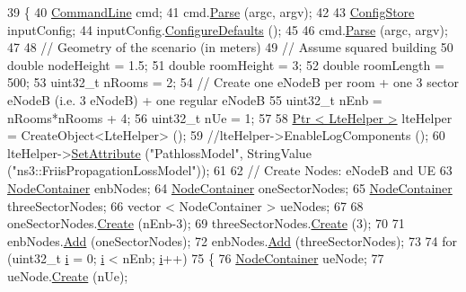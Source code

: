 \begin{DoxyCode}
39 \{
40   \hyperlink{classns3_1_1CommandLine}{CommandLine} cmd;
41   cmd.\hyperlink{classns3_1_1CommandLine_a5c10b85b3207e5ecb48d907966923156}{Parse} (argc, argv);
42 
43   \hyperlink{classns3_1_1ConfigStore}{ConfigStore} inputConfig;
44   inputConfig.\hyperlink{classns3_1_1ConfigStore_a0a6137574d7c847c3823af8b9d1bb886}{ConfigureDefaults} ();
45 
46   cmd.\hyperlink{classns3_1_1CommandLine_a5c10b85b3207e5ecb48d907966923156}{Parse} (argc, argv);
47 
48   \textcolor{comment}{// Geometry of the scenario (in meters)}
49   \textcolor{comment}{// Assume squared building}
50   \textcolor{keywordtype}{double} nodeHeight = 1.5;
51   \textcolor{keywordtype}{double} roomHeight = 3;
52   \textcolor{keywordtype}{double} roomLength = 500;
53   uint32\_t nRooms = 2;
54   \textcolor{comment}{// Create one eNodeB per room + one 3 sector eNodeB (i.e. 3 eNodeB) + one regular eNodeB}
55   uint32\_t nEnb = nRooms*nRooms + 4;
56   uint32\_t nUe = 1;
57 
58   \hyperlink{classns3_1_1Ptr}{Ptr < LteHelper >} lteHelper = CreateObject<LteHelper> ();
59   \textcolor{comment}{//lteHelper->EnableLogComponents ();}
60   lteHelper->\hyperlink{classns3_1_1ObjectBase_ac60245d3ea4123bbc9b1d391f1f6592f}{SetAttribute} (\textcolor{stringliteral}{"PathlossModel"}, StringValue (\textcolor{stringliteral}{"ns3::FriisPropagationLossModel"}));
61 
62   \textcolor{comment}{// Create Nodes: eNodeB and UE}
63   \hyperlink{classns3_1_1NodeContainer}{NodeContainer} enbNodes;
64   \hyperlink{classns3_1_1NodeContainer}{NodeContainer} oneSectorNodes;
65   \hyperlink{classns3_1_1NodeContainer}{NodeContainer} threeSectorNodes;
66   vector < NodeContainer > ueNodes;
67 
68   oneSectorNodes.\hyperlink{classns3_1_1NodeContainer_a787f059e2813e8b951cc6914d11dfe69}{Create} (nEnb-3);
69   threeSectorNodes.\hyperlink{classns3_1_1NodeContainer_a787f059e2813e8b951cc6914d11dfe69}{Create} (3);
70 
71   enbNodes.\hyperlink{classns3_1_1NodeContainer_aa60b3a0e70f2fb324e16ffcf8bf31fcb}{Add} (oneSectorNodes);
72   enbNodes.\hyperlink{classns3_1_1NodeContainer_aa60b3a0e70f2fb324e16ffcf8bf31fcb}{Add} (threeSectorNodes);
73 
74   \textcolor{keywordflow}{for} (uint32\_t \hyperlink{bernuolliDistribution_8m_a6f6ccfcf58b31cb6412107d9d5281426}{i} = 0; \hyperlink{bernuolliDistribution_8m_a6f6ccfcf58b31cb6412107d9d5281426}{i} < nEnb; \hyperlink{bernuolliDistribution_8m_a6f6ccfcf58b31cb6412107d9d5281426}{i}++)
75     \{
76       \hyperlink{classns3_1_1NodeContainer}{NodeContainer} ueNode;
77       ueNode.\hyperlink{classns3_1_1NodeContainer_a787f059e2813e8b951cc6914d11dfe69}{Create} (nUe);

\end{DoxyCode}
